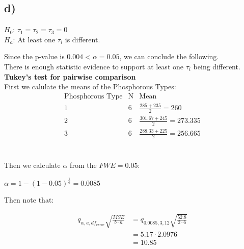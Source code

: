 \documentclass{article}
\begin{document}
\subsection*{d)}
\begin{flushleft}
    $H_0$: $\tau_1 = \tau_2 = \tau_3 = 0$ \\
    $H_a$: At least one $\tau_i$ is different.\\
\end{flushleft}
Since the p-value is $0.004 < \alpha = 0.05$, we can conclude the following. \\
There is enough statistic evidence to support at least one $\tau_i$ being different.
\\
\textbf{Tukey's test for pairwise comparison} \\
First we calulate the means of the Phosphorous Types: \\
\begin{equation*}
    \begin{array}{c|c|c}
        \text{Phosphorous Type} &\text{N}& \text{Mean} \\
        \hline
        1 & 6 & \frac{285+235}{2} = 260\\
        2 & 6 & \frac{301.67+245}{2} = 273.335\\
        3 & 6 & \frac{288.33+225}{2} = 256.665\\
    
    \end{array}
    \end{equation*}\\
\begin{flushleft}
Then we calculate $\alpha$ from the $FWE = 0.05$: \\
\end{flushleft}
$\alpha = 1 - (1- 0.05)^{\frac{1}{6}} = 0.0085$

\begin{flushleft}
    Then note that: \\
    \end{flushleft}
\begin{align*}
    q_{\alpha , a , df_{error}}\sqrt{\frac{MSE}{b \cdot n}} & = q_{0.0085 , 3 , 12}\sqrt{\frac{52.8}{2 \cdot 6}} \\
    & = 5.17 \cdot 2.0976 \\
    & = 10.85
\end{align*}
\end{document}
